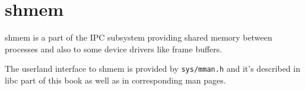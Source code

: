 \chapter{shmem}

\acf{shmem} is a part of the \ac{IPC} subsystem providing shared memory between
processes and also to some device drivers like frame buffers.

The userland interface to shmem is provided by \verb+sys/mman.h+ and it's
described in libc part of this book as well as in corresponding man pages.
